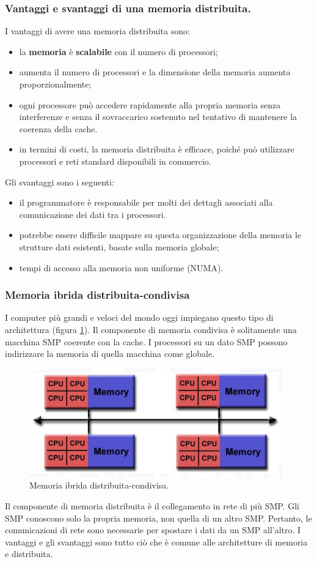 \subsubsection{Vantaggi e svantaggi di una memoria distribuita.} I vantaggi di avere una memoria distribuita sono:
\begin{itemize}
	\item la \textbf{memoria} è \textbf{scalabile} con il numero di processori; \item aumenta il numero di processori e la dimensione della memoria aumenta proporzionalmente; \item ogni processore può accedere rapidamente alla propria memoria senza interferenze e senza il sovraccarico sostenuto nel tentativo di mantenere la coerenza della cache. \item in termini di costi, la memoria distribuita è efficace, poiché può utilizzare processori e reti standard disponibili in commercio.
\end{itemize}
Gli svantaggi sono i seguenti:
\begin{itemize}
	\item il programmatore è responsabile per molti dei dettagli associati alla comunicazione dei dati tra i processori. \item potrebbe essere difficile mappare su questa organizzazione della memoria le strutture dati esistenti, basate sulla memoria globale; \item tempi di accesso alla memoria non uniforme (NUMA).
\end{itemize}
\subsubsection{Memoria ibrida distribuita-condivisa} I computer più grandi e veloci del  mondo oggi impiegano questo tipo di architettura (figura \ref{fig:hybrid-memory}). Il componente di memoria condivisa è solitamente una macchina SMP coerente con la cache. I processori su un dato SMP possono indirizzare la memoria di quella macchina come globale.

\begin{figure}[th]
	\centering
	\includegraphics[width=0.7\linewidth]{img/hybrid-memory}
	\caption{Memoria ibrida distribuita-condivisa.}
	\label{fig:hybrid-memory}
\end{figure}

Il componente di memoria distribuita è il collegamento in rete di più SMP. Gli SMP conoscono solo la propria memoria, non quella di un altro SMP. Pertanto, le comunicazioni di rete sono necessarie per spostare i dati da un SMP all'altro. I vantaggi e gli svantaggi sono tutto ciò che è comune alle architetture di memoria e distribuita.
